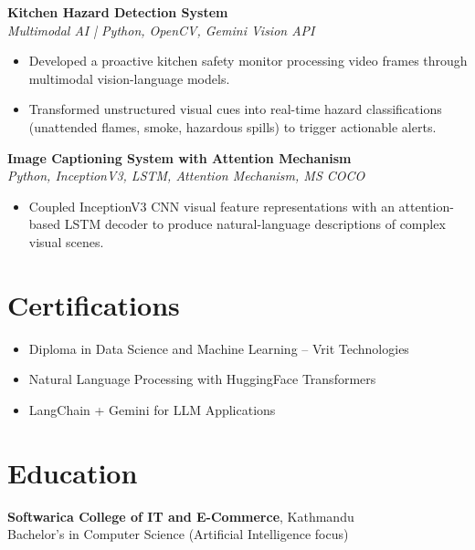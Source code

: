 \documentclass[a4paper,10pt]{article}
\begin{document}
\vspace{3pt}
\textbf{Kitchen Hazard Detection System} \\
\textit{Multimodal AI | Python, OpenCV, Gemini Vision API}
\begin{itemize}
    \item Developed a proactive kitchen safety monitor processing video frames through multimodal vision-language models.
    \item Transformed unstructured visual cues into real-time hazard classifications (unattended flames, smoke, hazardous spills) to trigger actionable alerts.
\end{itemize}

\vspace{3pt}
\textbf{Image Captioning System with Attention Mechanism} \\
\textit{Python, InceptionV3, LSTM, Attention Mechanism, MS COCO}
\begin{itemize}
    \item Coupled InceptionV3 CNN visual feature representations with an attention-based LSTM decoder to produce natural-language descriptions of complex visual scenes.
\end{itemize}

\section*{Certifications}
\begin{itemize}
    \item Diploma in Data Science and Machine Learning -- Vrit Technologies
    \item Natural Language Processing with HuggingFace Transformers
    \item LangChain + Gemini for LLM Applications
\end{itemize}

\section*{Education}
\textbf{Softwarica College of IT and E-Commerce}, Kathmandu \\
Bachelor's in Computer Science (Artificial Intelligence focus)
\end{document}

